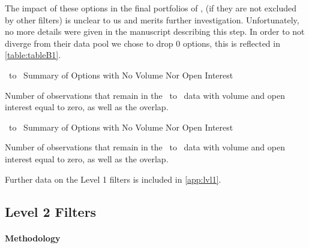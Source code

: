 The impact of these options in the final portfolios of \citet{constantinides2013}, (if they are not excluded by other filters) is unclear to us and merits further investigation. Unfortunately, no more details were given in the manuscript describing this step. In order to not diverge from their data pool we chose to drop 0 options, this is reflected in \autoref{table:tableB1}.


\vspace{10pt}
\begin{table}[ht]

  \centering
  \caption{\STARTONE\ to \ENDONE\ Summary of Options with No Volume Nor Open Interest}
  
  
  \caption*{
    Number of observations that remain in the \STARTONE\ to \ENDONE\ data with volume and open interest equal to zero, as well as the overlap. 
  }
  \label{table:time1lvl1T1}
\end{table}
  
  
\vspace{10pt}
\begin{table}[ht]
  \centering
  \caption{\STARTTWO\ to \ENDONE\ Summary of Options with No Volume Nor Open Interest}
  
  
  \caption*{
    Number of observations that remain in the \STARTTWO\ to \ENDTWO\ data with volume and open interest equal to zero, as well as the overlap. 
  }
  \label{table:time2lvl1T1}
\end{table}


Further data on the Level 1 filters is included in \autoref{app:lvl1}. 


\clearpage


\subsection {Level 2 Filters}

\paragraph{Methodology}

